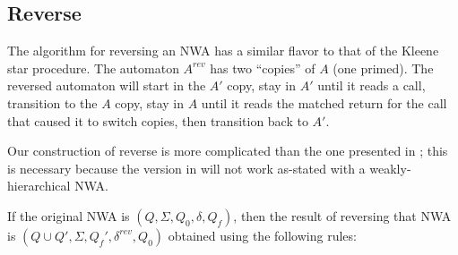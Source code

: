 
\subsection{Reverse}
\label{Se:Reverse}

The algorithm for reversing an NWA has a similar flavor to that of the Kleene
star procedure. The automaton $A^{rev}$ has two ``copies'' of $A$ (one
primed). The reversed automaton will start in the $A'$ copy, stay in $A'$
until it reads a call, transition to the $A$ copy, stay in $A$ until it reads
the matched return for the call that caused it to switch copies, then
transition back to $A'$.

Our construction of reverse is more complicated than the one presented in
\cite{JACM:AM2009}; this is necessary because the version in
\cite{JACM:AM2009} will not work as-stated with a weakly-hierarchical
NWA.

If the original NWA is $(Q, \Sigma, Q_0, \delta, Q_f)$, then the result of
reversing that NWA is $(Q \cup Q', \Sigma, Q_f', \delta^{rev}, Q_0)$ obtained using
the following rules:



